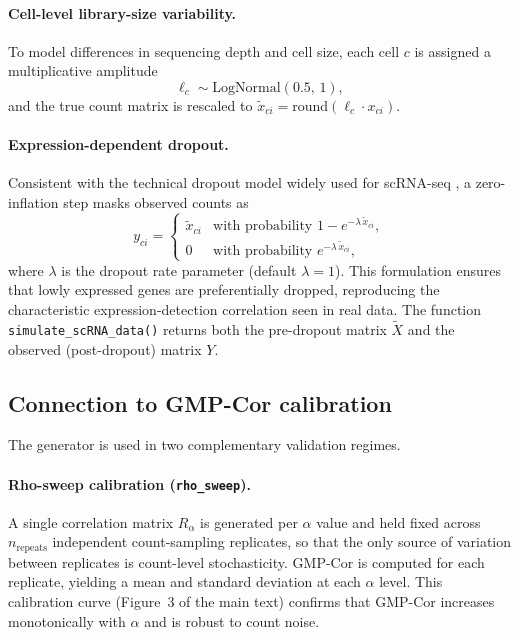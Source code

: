 \paragraph{Cell-level library-size variability.}
To model differences in sequencing depth and cell size, each cell $c$ is assigned a
multiplicative amplitude
\begin{equation}
  \ell_c \sim \mathrm{LogNormal}(0.5,\,1),
\end{equation}
and the true count matrix is rescaled to
$\tilde{x}_{ci} = \mathrm{round}(\ell_c \cdot x_{ci})$.

\paragraph{Expression-dependent dropout.}
Consistent with the technical dropout model widely used for scRNA-seq
\citep{Pierson2015,Andrews2019}, a zero-inflation step masks observed counts as
\begin{equation}
  y_{ci} =
  \begin{cases}
    \tilde{x}_{ci} & \text{with probability } 1 - e^{-\lambda\,\tilde{x}_{ci}}, \\
    0              & \text{with probability } e^{-\lambda\,\tilde{x}_{ci}},
  \end{cases}
\end{equation}
where $\lambda$ is the dropout rate parameter (default $\lambda = 1$).
This formulation ensures that lowly expressed genes are preferentially dropped,
reproducing the characteristic expression-detection correlation seen in real data.
The function \texttt{simulate\_scRNA\_data()} returns both the pre-dropout matrix
$\tilde{X}$ and the observed (post-dropout) matrix $Y$.

\subsection*{Connection to GMP-Cor calibration}

The generator is used in two complementary validation regimes.

\paragraph{Rho-sweep calibration (\texttt{rho\_sweep}).}
A single correlation matrix $R_\alpha$ is generated per $\alpha$ value and held
fixed across $n_\mathrm{repeats}$ independent count-sampling replicates, so that
the only source of variation between replicates is count-level stochasticity.
GMP-Cor is computed for each replicate, yielding a mean and standard deviation at
each $\alpha$ level.
This calibration curve (Figure~3 of the main text) confirms that GMP-Cor increases
monotonically with $\alpha$ and is robust to count noise.

